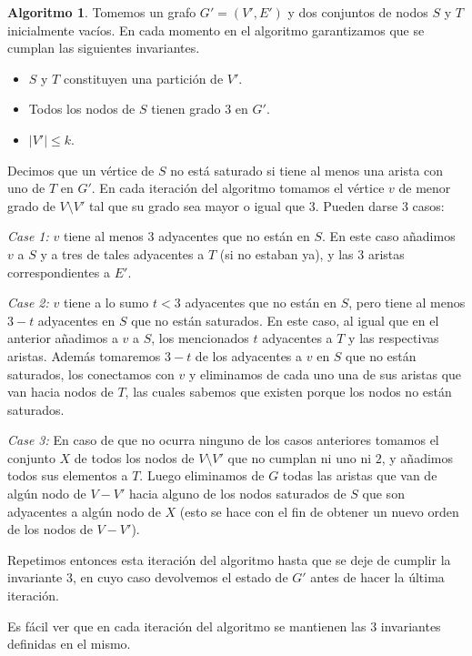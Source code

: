\documentclass[10pt]{amsart}
\theoremstyle{definition}
\newtheorem{algo}[theorem]{Algoritmo}
\numberwithin{equation}{section}
\begin{document}
	\begin{algo} \label{alg1}
		Tomemos un grafo $G' = (V',E')$ y dos conjuntos de nodos $S$ y $T$ inicialmente vac\'ios. En cada momento en el algoritmo garantizamos que se cumplan las siguientes invariantes.
		\begin{itemize}
			\item[1.] $S$ y $T$ constituyen una partici\'on de $V'$.
			\item[2.] Todos los nodos de $S$ tienen grado $3$ en $G'$.
			\item[3.] $|V'| \le k$.
		\end{itemize}
		
		 Decimos que un v\'ertice de $S$ no est\'a saturado si tiene al menos una arista con uno de $T$ en $G'$. En cada iteraci\'on del algoritmo tomamos el v\'ertice $v$ de menor grado de $V \setminus V'$ tal que su grado sea mayor o igual que $3$. Pueden darse $3$ casos:
		 
		\emph{Case 1:} $v$ tiene al menos $3$ adyacentes que no est\'an en $S$. En este caso a\~nadimos $v$ a $S$ y a tres de tales adyacentes a $T$ (si no estaban ya), y las $3$ aristas correspondientes a $E'$. 
		
		\emph{Case 2:} $v$ tiene a lo sumo $t < 3$ adyacentes que no est\'an en $S$, pero tiene al menos $3 - t$ adyacentes en $S$ que no est\'an saturados. En este caso, al igual que en el anterior a\~nadimos a $v$ a $S$, los mencionados $t$ adyacentes a $T$ y las respectivas aristas. Adem\'as tomaremos $3 - t$ de los adyacentes a $v$ en $S$ que no est\'an saturados, los conectamos con $v$ y eliminamos de cada uno una de sus aristas que van hacia nodos de $T$, las cuales sabemos que existen porque los nodos no est\'an saturados.
		
		\emph{Case 3:} En caso de que no ocurra ninguno de los casos anteriores tomamos el conjunto $X$ de todos los nodos de $V \setminus V'$ que no cumplan ni uno ni $2$, y a\~nadimos todos sus elementos a $T$. Luego eliminamos de $G$ todas las aristas que van de alg\'un nodo de $V - V'$ hacia alguno de los nodos saturados de $S$ que son adyacentes a alg\'un nodo de $X$ (esto se hace con el fin de obtener un nuevo orden de los nodos de $V - V'$).
		
		Repetimos entonces esta iteraci\'on del algoritmo hasta que se deje de cumplir la invariante $3$, en cuyo caso devolvemos el estado de $G'$ antes de hacer la \'ultima iteraci\'on.
	\end{algo}
	
	Es f\'acil ver que en cada iteraci\'on del algoritmo se mantienen las $3$ invariantes definidas en el mismo. 
	
\end{document}
